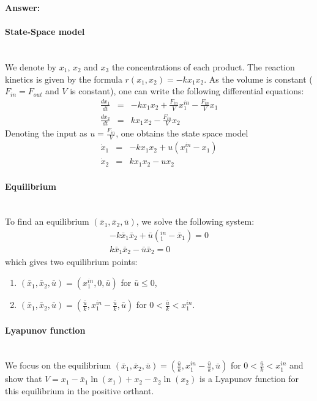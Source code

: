 \textbf{Answer: }~\\

\paragraph{State-Space model}~\\

We denote by $x_1$, $x_2$ and $x_3$ the concentrations of each product. The reaction kinetics is given by the formula $r(x_1,x_2)=-kx_1x_2$. As the volume is constant ($F_{in}=F_{out}$ and $V$ is constant), one can write the following differential equations:
$$
\begin{array}{rcl}
\frac{dx_1}{dt} &=& -kx_1x_2+\frac{F_{in}}{V}x_1^{in}-\frac{F_{in}}{V}x_1\\
\frac{dx_2}{dt} &=& kx_1x_2-\frac{F_{in}}{V}x_2
\end{array}
$$
Denoting the input as $u=\frac{F_{in}}{V}$, one obtains the state space model
$$
\begin{array}{rcl}
\dot{x}_1&=&-kx_1x_2+u(x_1^{in}-x_1)\\
\dot{x}_2&=&kx_1x_2-ux_2
\end{array}
$$

\paragraph{Equilibrium}~\\
To find an equilibrium $(\bar{x}_1,\bar{x}_2,\bar{u})$, we solve the following system:
$$
\begin{array}{l}
-k\bar{x}_1\bar{x}_2+\bar{u}(_1^{in}-\bar{x}_1)=0\\
k\bar{x}_1\bar{x}_2-\bar{u}\bar{x}_2=0
\end{array}
$$
which gives two equilibrium points:
\begin{enumerate}
\item $(\bar{x}_1,\bar{x}_2,\bar{u})=(x_1^{in},0,\bar{u})$ for $\bar{u}\leq 0$,
\item $(\bar{x}_1,\bar{x}_2,\bar{u})=(\frac{\bar{u}}{k},x_1^{in}-\frac{\bar{u}}{k},\bar{u})$ for $0<\frac{\bar{u}}{k}<x_1^{in}$.
\end{enumerate}

\paragraph{Lyapunov function}~\\

We focus on the equilibrium $(\bar{x}_1,\bar{x}_2,\bar{u})=(\frac{\bar{u}}{k},x_1^{in}-\frac{\bar{u}}{k},\bar{u})$ for $0<\frac{\bar{u}}{k}<x_1^{in}$ and show that $V=x_1-\bar{x}_1\ln(x_1)+x_2-\bar{x}_2\ln(x_2)$ is a Lyapunov function for this equilibrium in the positive orthant.

